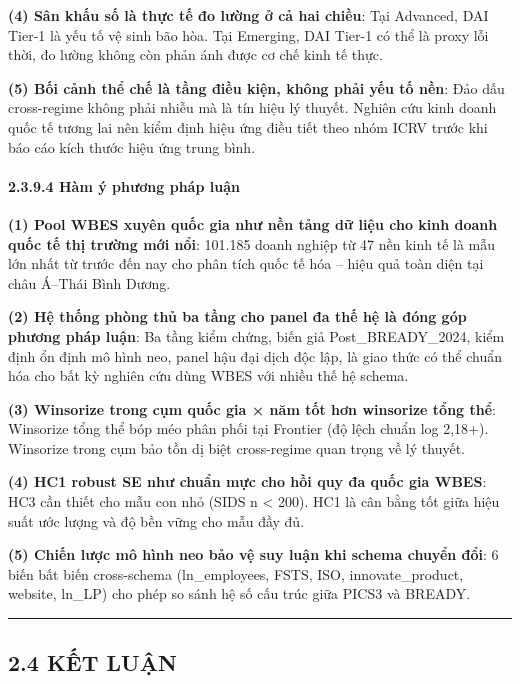 \documentclass[12pt,a4paper]{article}
\begin{document}
\textbf{(4) Sân khấu số là thực tế đo lường ở cả hai chiều}: Tại
Advanced, DAI Tier-1 là yếu tố vệ sinh bão hòa. Tại Emerging, DAI Tier-1
có thể là proxy lỗi thời, đo lường không còn phản ánh được cơ chế kinh
tế thực.

\textbf{(5) Bối cảnh thể chế là tầng điều kiện, không phải yếu tố nền}:
Đảo dấu cross-regime không phải nhiễu mà là tín hiệu lý thuyết. Nghiên
cứu kinh doanh quốc tế tương lai nên kiểm định hiệu ứng điều tiết theo
nhóm ICRV trước khi báo cáo kích thước hiệu ứng trung bình.

\hypertarget{2394-huxe0m-uxfd-phux1b0ux1a1ng-phuxe1p-luux1eadn}{%
\paragraph{2.3.9.4 Hàm ý phương pháp
luận}\label{2394-huxe0m-uxfd-phux1b0ux1a1ng-phuxe1p-luux1eadn}}

\textbf{(1) Pool WBES xuyên quốc gia như nền tảng dữ liệu cho kinh doanh
quốc tế thị trường mới nổi}: 101.185 doanh nghiệp từ 47 nền kinh tế là
mẫu lớn nhất từ trước đến nay cho phân tích quốc tế hóa -- hiệu quả toàn
diện tại châu Á--Thái Bình Dương.

\textbf{(2) Hệ thống phòng thủ ba tầng cho panel đa thế hệ là đóng góp
phương pháp luận}: Ba tầng kiểm chứng, biến giả Post\_BREADY\_2024, kiểm
định ổn định mô hình neo, panel hậu đại dịch độc lập, là giao thức có
thể chuẩn hóa cho bất kỳ nghiên cứu dùng WBES với nhiều thế hệ schema.

\textbf{(3) Winsorize trong cụm quốc gia × năm tốt hơn winsorize tổng
thể}: Winsorize tổng thể bóp méo phân phối tại Frontier (độ lệch chuẩn
log 2,18+). Winsorize trong cụm bảo tồn dị biệt cross-regime quan trọng
về lý thuyết.

\textbf{(4) HC1 robust SE như chuẩn mực cho hồi quy đa quốc gia WBES}:
HC3 cần thiết cho mẫu con nhỏ (SIDS n \textless{} 200). HC1 là cân bằng
tốt giữa hiệu suất ước lượng và độ bền vững cho mẫu đầy đủ.

\textbf{(5) Chiến lược mô hình neo bảo vệ suy luận khi schema chuyển
đổi}: 6 biến bất biến cross-schema (ln\_employees, FSTS, ISO,
innovate\_product, website, ln\_LP) cho phép so sánh hệ số cấu trúc giữa
PICS3 và BREADY.

\begin{center}\rule{0.5\linewidth}{0.5pt}\end{center}

\hypertarget{24-kux1ebft-luux1eadn}{%
\subsection{2.4 KẾT LUẬN}\label{24-kux1ebft-luux1eadn}}
\end{document}
